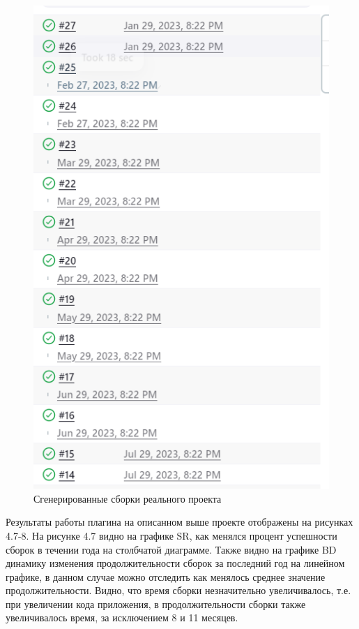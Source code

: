  \begin{figure}[ht!] 
	\center
	\includegraphics [scale=0.67] {my_folder/images//genetatedBuild}
	\caption{Сгенерированные сборки реального проекта} 
	\label{fig:genetatedBuild}  
\end{figure}

Результаты работы плагина на описанном выше проекте отображены на рисунках 4.7-8. На рисунке 4.7 видно на графике SR, как менялся процент успешности сборок в течении года на столбчатой диаграмме. Также видно на графике BD динамику изменения продолжительности сборок за последний год на линейном графике, в данном случае можно отследить как менялось среднее значение продолжительности. Видно, что время сборки незначительно увеличивалось, т.е. при увеличении кода приложения, в продолжительности сборки также увеличивалось время, за исключением 8 и 11 месяцев. 



